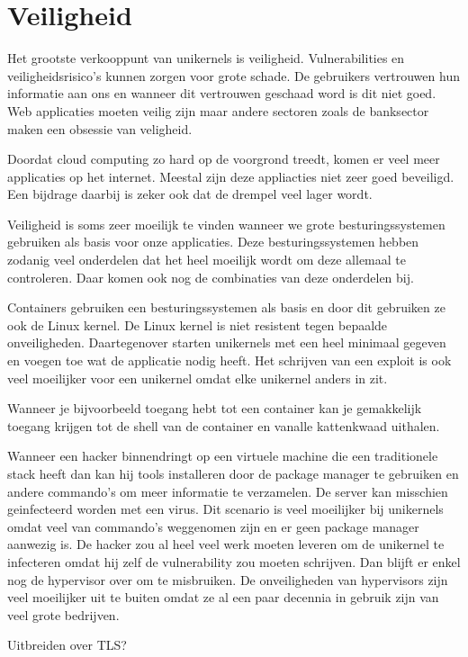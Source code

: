 \documentclass[pdftex,a4paper,12pt,twoside]{report}
\begin{document}
\section{Veiligheid}

Het grootste verkooppunt van unikernels is veiligheid. Vulnerabilities en veiligheidsrisico's kunnen zorgen voor grote schade. De gebruikers vertrouwen hun informatie aan ons en wanneer dit vertrouwen geschaad word is dit niet goed. Web applicaties moeten veilig zijn maar andere sectoren zoals de banksector maken een obsessie van veligheid.

Doordat cloud computing zo hard op de voorgrond treedt, komen er veel meer applicaties op het internet. Meestal zijn deze appliacties niet zeer goed beveiligd. Een bijdrage daarbij is zeker ook dat de drempel veel lager wordt.

Veiligheid is soms zeer moeilijk te vinden wanneer we grote besturingssystemen gebruiken als basis voor onze applicaties. Deze besturingssystemen hebben zodanig veel onderdelen dat het heel moeilijk wordt om deze allemaal te controleren. Daar komen ook nog de combinaties van deze onderdelen bij.

Containers gebruiken een besturingssystemen als basis en door dit gebruiken ze ook de Linux kernel. De Linux kernel is niet resistent tegen bepaalde onveiligheden. Daartegenover starten unikernels met een heel minimaal gegeven en voegen toe wat de applicatie nodig heeft. Het schrijven van een exploit is ook veel moeilijker voor een unikernel omdat elke unikernel anders in zit.

Wanneer je bijvoorbeeld toegang hebt tot een container kan je gemakkelijk toegang krijgen tot de shell van de container en vanalle kattenkwaad uithalen.

Wanneer een hacker binnendringt op een virtuele machine die een traditionele stack heeft dan kan hij tools installeren door de package manager te gebruiken en andere commando's om meer informatie te verzamelen. De server kan misschien geinfecteerd worden met een virus. Dit scenario is veel moeilijker bij unikernels omdat veel van commando's weggenomen zijn en er geen package manager aanwezig is. De hacker zou al heel veel werk moeten leveren om de unikernel te infecteren omdat hij zelf de vulnerability zou moeten schrijven. Dan blijft er enkel nog de hypervisor over om te misbruiken. De onveiligheden van hypervisors zijn veel moeilijker uit te buiten omdat ze al een paar decennia in gebruik zijn van veel grote bedrijven.

Uitbreiden over TLS?
\end{document}
